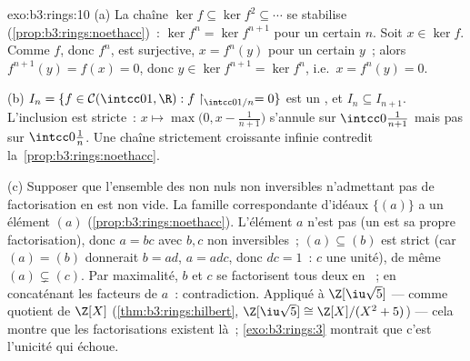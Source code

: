 \begin{solution}{exo:b3:rings:10}
(a) La chaîne $\ker f \subseteq \ker f^2 \subseteq \cdots$ se
stabilise (\cref{prop:b3:rings:noethacc})~: $\ker f^n = \ker
f^{n+1}$ pour un certain $n$. Soit $x \in \ker f$. Comme $f$,
donc $f^n$, est surjective, $x = f^n(y)$ pour un certain $y$~;
alors $f^{n+1}(y) = f(x) = 0$, donc $y \in \ker f^{n+1} = \ker
f^n$, i.e.\ $x = f^n(y) = 0$.

(b) $I_n = \{f \in \mathcal C(\intcc01, \R) : f\restriction_{
\intcc0{1/n}} = 0\}$ est un , et $I_n \subseteq I_{n+1}$.
L'inclusion est stricte~: $x \mapsto \max\bigl(0, x -
\frac1{n+1}\bigr)$ s'annule sur $\intcc0{\frac1{n+1}}$ mais pas
sur $\intcc0{\frac1n}$. Une chaîne strictement croissante
infinie contredit la~\cref{prop:b3:rings:noethacc}.

(c) Supposer que l'ensemble des non nuls non inversibles
n'admettant pas de factorisation en  est non vide.
La famille correspondante d'idéaux $\{(a)\}$ a un élément
 $(a)$ (\cref{prop:b3:rings:noethacc}). L'élément $a$
n'est pas  (un  est sa propre
factorisation), donc $a = bc$ avec $b, c$ non inversibles~; $(a)
\subseteq (b)$ est strict (car $(a) = (b)$ donnerait $b = ad$, $a
= adc$, donc $dc = 1$~: $c$ une unité), de même $(a) \subsetneq
(c)$. Par maximalité, $b$ et $c$ se factorisent tous deux en
~; en concaténant les facteurs de $a$~:
contradiction. Appliqué à $\Z[\iu\sqrt5]$ ---  comme
quotient de $\Z[X]$ (\cref{thm:b3:rings:hilbert},
$\Z[\iu\sqrt5] \cong \Z[X]/(X^2+5)$) --- cela montre que les
factorisations existent là~; \cref{exo:b3:rings:3} montrait que
c'est l'unicité qui échoue.
\end{solution}

